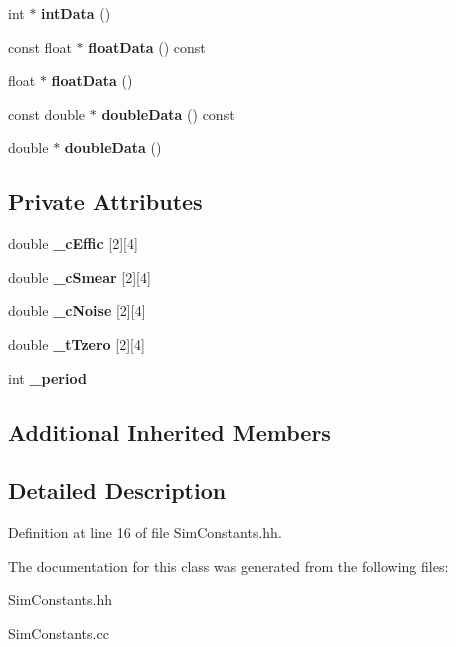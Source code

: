 \begin{DoxyCompactItemize}
\item 
int $\ast$ {\bfseries int\-Data} ()\label{classTBTrack_1_1SimConstants_a6ed02c18a4bf75b1697b96115d4aded8}

\item 
const float $\ast$ {\bfseries float\-Data} () const \label{classTBTrack_1_1SimConstants_a2391df4a1c758c629a9b4d41c3b67575}

\item 
float $\ast$ {\bfseries float\-Data} ()\label{classTBTrack_1_1SimConstants_a174d1d454c38e840c51072a7517d1a6f}

\item 
const double $\ast$ {\bfseries double\-Data} () const \label{classTBTrack_1_1SimConstants_a39f0137c046cfcf045501494a9d6bcb4}

\item 
double $\ast$ {\bfseries double\-Data} ()\label{classTBTrack_1_1SimConstants_af88c1287049c36b8a0cd8e3dbc571ec6}

\end{DoxyCompactItemize}
\subsection*{Private Attributes}
\begin{DoxyCompactItemize}
\item 
double {\bfseries \-\_\-c\-Effic} [2][4]\label{classTBTrack_1_1SimConstants_af89d5f24d72339ca570c1c608d49416e}

\item 
double {\bfseries \-\_\-c\-Smear} [2][4]\label{classTBTrack_1_1SimConstants_a141d5c2bcd3f0fa0c147b97f70ed2658}

\item 
double {\bfseries \-\_\-c\-Noise} [2][4]\label{classTBTrack_1_1SimConstants_a6d7e1f44e008e7aa7c080a5b8bd1bd68}

\item 
double {\bfseries \-\_\-t\-Tzero} [2][4]\label{classTBTrack_1_1SimConstants_a7a3697758c4dcfd8eb19d99679f7bea1}

\item 
int {\bfseries \-\_\-period}\label{classTBTrack_1_1SimConstants_a821162c3bd18ea4c010a705e82c8aa01}

\end{DoxyCompactItemize}
\subsection*{Additional Inherited Members}


\subsection{Detailed Description}


Definition at line 16 of file Sim\-Constants.\-hh.



The documentation for this class was generated from the following files\-:\begin{DoxyCompactItemize}
\item 
Sim\-Constants.\-hh\item 
Sim\-Constants.\-cc\end{DoxyCompactItemize}
